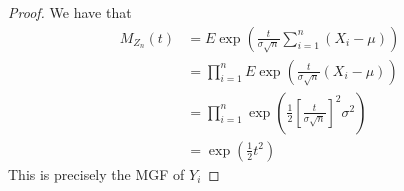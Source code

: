 \documentclass{amsart}
\begin{document}
\begin{proof}
    We have that 
    \[
    \]
    \begin{align*}
    M_{Z_n}(t) &= E\exp\left(
        \frac{t}{\sigma \sqrt{n}} \sum_{i = 1}^n (X_i - \mu)
    \right) \\
    &= \prod_{i = 1}^n E \exp\left(
        \frac{t}{\sigma \sqrt{n}} (X_i - \mu)
    \right) \\
    &= \prod_{i = 1}^n \exp\left(
        \frac{1}{2} \left[
            \frac{t}{\sigma \sqrt{n}}
        \right]^2 \sigma^2
    \right) \\
    &= \exp\left(
        \frac12 t^2
    \right)
    \end{align*}
    This is precisely the MGF of $Y_i$
\end{proof}
\end{document}
